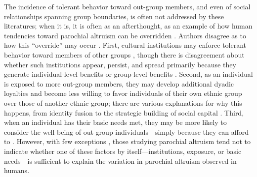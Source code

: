 \documentclass[bibauthoryear]{aa}
\begin{document}
The incidence of tolerant behavior toward out-group members, and even of social relationships spanning group boundaries, is often not addressed by these literatures; when it is, it is often as an afterthought, as an example of how human tendencies toward parochial altruism can be overridden \citep{choi2007coevolution, glowacki2017evolutionary}. Authors disagree as to how this ``override'' may occur \citep{pisor2019evolution}. %
First, cultural institutions may enforce tolerant behavior toward members of other groups \citep{fearon1996explaining, fry2018evolutionary}, though there is disagreement about whether such institutions appear, persist, and spread primarily because they generate individual-level benefits or group-level benefits \citep[see][for a useful discussion]{purzycki2020institutions}. Second, as an individual is exposed to more out-group members, they may develop additional dyadic loyalties and become less willing to favor individuals of their own ethnic group over those of another ethnic group; there are various explanations for why this happens, from identity fusion to the strategic building of social capital \citep{brewer1976ethnocentrism, beck2006cosmopolitan, buchan2009globalization, fukuyama2001social, hruschka2013economic, mau2008cosmopolitan, singer2011expanding}. Third, when an individual has their basic needs met, they may be more likely to consider the well-being of out-group individuals---simply because they can afford to \citep{hruschka2014impartial, silva2014cooperation}. However, with few exceptions \citep{hruschka2013economic, vardy2019property}, those studying parochial altruism tend not to indicate whether one of these factors by itself---institutions, exposure, or basic needs---is sufficient to explain the variation in parochial altruism observed in humans.
\end{document}
